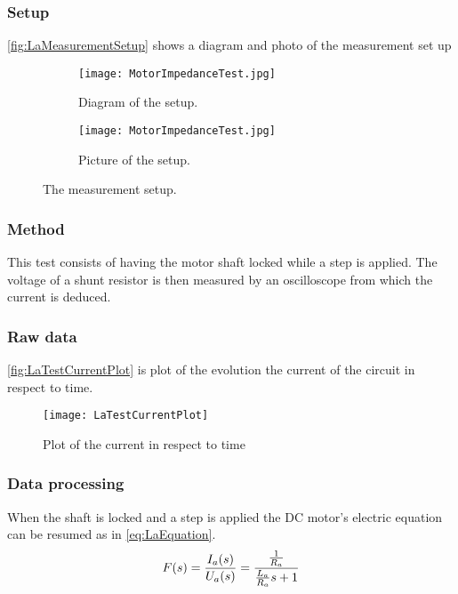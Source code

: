 \subsubsection*{Setup}
\autoref{fig:LaMeasurementSetup} shows a diagram and photo of the measurement set up
\begin{figure}[htbp]
	\centering
	\begin{subfigure}{0.50\textwidth}
		\texttt{[image: MotorImpedanceTest.jpg]}
		\caption{Diagram of the setup.} \label{fig:LaMeasurementDiagram}
	\end{subfigure}
	\begin{subfigure}{0.40\textwidth}
		\texttt{[image: MotorImpedanceTest.jpg]}
		\caption{Picture of the setup.} \label{fig:LaMeasurementPictures}
	\end{subfigure}
	\caption{The measurement setup.} \label{fig:LaMeasurementSetup}   
\end{figure}

\subsubsection*{Method}
This test consists of having the motor shaft locked while a step is applied. The voltage of a shunt resistor is then measured by an oscilloscope from which the current is deduced.
\subsubsection*{Raw data}
\autoref{fig:LaTestCurrentPlot} is plot of the evolution the current of the circuit in respect to time.

\begin{figure}[htbp]
	\centering
	\texttt{[image: LaTestCurrentPlot]}
	\caption{Plot of the current in respect to time}\label{fig:LaTestCurrentPlot}
\end{figure}

\subsubsection*{Data processing}
When the shaft is locked and a step is applied the DC motor's electric equation can be resumed as in \autoref{eq:LaEquation}.
\begin{equation}
	F(s)=\frac{I_a(s)}{U_a(s)}=\frac{\frac{1}{R_a}}{\frac{L_a}{R_a} s+1} \addunit{1}
	\label{eq:LaEquation}
\end{equation}
\startexplain
{}
\stopexplain

